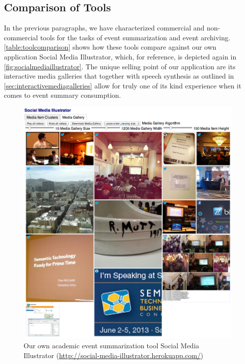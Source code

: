 \subsection{Comparison of Tools}

In the previous paragraphs, we have characterized
commercial and non-commercial tools for the tasks
of event summarization and event archiving. 
\autoref{table:toolcomparison} shows how these tools
compare against our own application Social Media Illustrator,
which, for reference, is depicted again in \autoref{fig:socialmediaillustrator}.
The unique selling point of our application
are its interactive media galleries that together with speech synthesis
as outlined in \autoref{sec:interactivemediagalleries}
allow for truly one of its kind experience when it comes to 
event summary consumption.

\begin{figure}
  \centering
  \includegraphics[width=\linewidth]{socialmediaillustrator.png}
  \caption[Our own academic event summarization tool Social Media Illustrator]{Our own academic event summarization tool Social Media Illustrator (\url{http://social-media-illustrator.herokuapp.com/})}
  \label{fig:socialmediaillustrator}
\end{figure}


